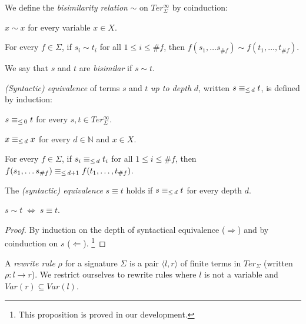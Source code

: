 \begin{definition}\label{def:bisimilarity}%
We define the \emph{bisimilarity relation} $\sim$ on $Ter_\Sigma^\infty$ by
coinduction:
\begin{compactenum}
  \item
    $x \sim x$ for every variable $x \in X$.
  \item
    For every $f \in \Sigma$, if $s_i \sim t_i$ for all $1 \leq i \leq \#f$,
    then $f(s_1, \ldots s_{\#f}) \sim f(t_1, \ldots, t_{\#f})$.
\end{compactenum}
We say that $s$ and $t$ are \emph{bisimilar} if $s \sim t$.
\end{definition}

\begin{definition}\label{def:equiv}%
\emph{(Syntactic) equivalence} of terms $s$ and $t$ \emph{up to depth} $d$,
written $s \equiv_{\le \, d} t$, is defined by induction:
\begin{compactenum}
  \item $s \equiv_{\le \, 0} t$ for every $s, t \in Ter_\Sigma^\infty$.
  \item $x \equiv_{\le \, d} x$ for every $d \in \mathbb{N}$ and $x \in X$.
  \item For every $f \in \Sigma$, if $s_i \equiv_{\le \, d} t_i$ for all $1 \leq i
    \leq \#f$, then $f(s_1, \ldots s_{\#f}) \equiv_{\le \, d+1} f(t_1, \ldots,
    t_{\#f})$.
\end{compactenum}
The \emph{(syntactic) equivalence} $s \equiv t$ holds if $s \equiv_{\le \, d} t$ for
every depth $d$.
\end{definition}

\begin{proposition}\label{prop:equalities}
$s \sim t \; \Leftrightarrow \; s \equiv t$.
\end{proposition}
\begin{proof}
By induction on the depth of syntactical equivalence ($\Rightarrow$) and by
coinduction on $s$ ($\Leftarrow$).
\footnote{This proposition is proved in our \Coq development.}
\end{proof}

\begin{definition}%
  A \emph{rewrite rule} $\rho$ for a signature $\Sigma$ is a pair $\langle l,
  r \rangle$ of finite terms in $Ter_\Sigma$ (written $\rho : l \rightarrow
  r$). We restrict ourselves to rewrite rules where $l$ is not a variable and
  $Var(r) \subseteq Var(l)$.
\end{definition}

